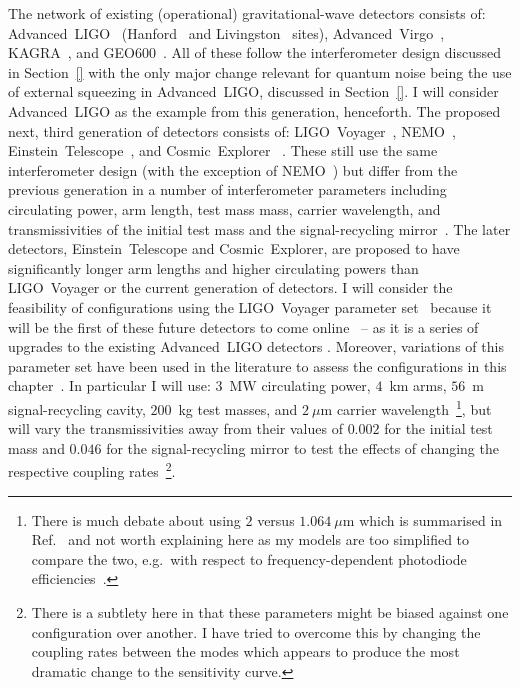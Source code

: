 The network of existing (operational) gravitational-wave detectors consists of: Advanced~LIGO~\cite{} (Hanford~\cite{} and Livingston~\cite{} sites), Advanced~Virgo~\cite{}, KAGRA~\cite{}, and GEO600~\cite{}. All of these follow the interferometer design discussed in Section~\ref{} with the only major change relevant for quantum noise  being the use of external squeezing in Advanced~LIGO, discussed in Section~\ref{}. I will consider Advanced~LIGO as the example from this generation, henceforth. 
The proposed next, third generation of  detectors consists of: LIGO~Voyager~\cite{}, NEMO~\cite{}, Einstein~Telescope~\cite{}, and Cosmic~Explorer~\cite{} . These still use the same interferometer design (with the exception of NEMO~\cite{})  but differ from the previous generation in a number of interferometer parameters including circulating power, arm length, test mass mass, carrier wavelength, and transmissivities of the initial test mass and the signal-recycling mirror~\cite{}. 
The later detectors, Einstein~Telescope and Cosmic~Explorer, are proposed to have significantly longer arm lengths and higher circulating powers than LIGO~Voyager or the current generation of detectors. 
I will consider the feasibility of configurations using the LIGO~Voyager parameter set~\cite{} because it will be the first of these future detectors to come online~\cite{} -- as it is a series of upgrades to the existing Advanced~LIGO detectors . Moreover, variations of this parameter set have been used in the literature to assess the configurations in this chapter~\cite{Li2020,Miao2018,Adya2020}. In particular I will use: $3$~MW circulating power, $4$~km arms, $56$~m signal-recycling cavity, $200$~kg test masses, and $2~\mu\text{m}$ carrier wavelength~\footnote{There is much debate about using $2$ versus $1.064~\mu\text{m}$ which is summarised in Ref.~\cite{} and not worth explaining here as my models are too simplified to compare the two, e.g.\ with respect to frequency-dependent photodiode efficiencies~\cite{}. }, but will vary the transmissivities away from their values of $0.002$ for the initial test mass and $0.046$ for the signal-recycling mirror to test the effects of changing the respective coupling rates~\footnote{There is a subtlety here in that these parameters might be biased against one configuration over another. I have tried to overcome this by changing the coupling rates between the modes which appears to produce the most dramatic change to the sensitivity curve. }. 

